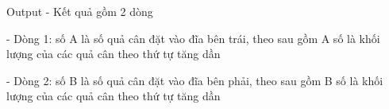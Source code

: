 Output
- Kết quả gồm 2 dòng  

   - Dòng 1: số A là số quả cân đặt vào đĩa bên trái, theo sau gồm A số là khối lượng của các quả cân theo thứ tự tăng dần  

   - Dòng 2: số B là số quả cân đặt vào đĩa bên phải, theo sau gồm B số là khối lượng của các quả cân theo thứ tự tăng dần
